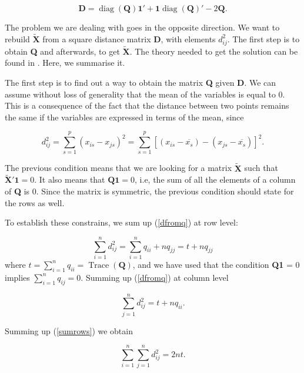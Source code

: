 \documentclass[11pt]{report}
\DeclareMathOperator{\Tr}{Trace}
\DeclareMathOperator{\diag}{diag}
\begin{document}
\[
\mathbf{D} = \diag(\mathbf{Q}) \mathbf{1}' + \mathbf{1}\diag(\mathbf{Q})' - 2\mathbf{Q}.
\]

\indent The problem we are dealing with goes in the opposite direction. We want 
to rebuild $\mathbf{\widetilde{X}}$ from a square distance matrix \textbf{D}, 
with elements $d_{ij}^2$. The first step is to obtain \textbf{Q} and afterwards, 
to get $\mathbf{\widetilde{X}}$. The theory needed to get the solution can be 
found in \cite{pena_libro}. Here, we summarise it.

\indent The first step is to find out a way to obtain the matrix \textbf{Q} 
given \textbf{D}. We can assume without loss of generality that the mean of 
the variables is equal to 0. This is a consequence of the fact that the distance 
between two points remains the same if the variables are expressed in terms 
of the mean, since


\begin{equation} \label{dtraslated}
d_{ij}^2 = \sum_{s = 1}^p (x_{is} - x_{js})^2 = \sum_{s=1} ^p [(x_{is} - \overline{x_s})- (x_{js} - \overline{x_s})]^2.
\end{equation}

\indent The previous condition means that we are looking for a matrix  
$\mathbf{\widetilde{X}}$ such that $\mathbf{\widetilde{X}'}\mathbf{1} = 0$. 
It also means that $\mathbf{Q}\mathbf{1} = 0$, i.e, the sum of all the elements 
of a column of \textbf{Q} is 0. Since the matrix is symmetric, the previous 
condition should state for the rows as well. 

\indent To establish these constrains, we sum up (\ref{dfromq}) at row level:

\begin{equation} \label{sumrows}
\sum_{i = 1}^n d_{ij}^2 = \sum_{i = 1}^n q_{ii} + nq_{jj} = t + nq_{jj}
\end{equation}
where $t = \sum_{i = 1}^n q_{ii} = \Tr(\mathbf{Q})$, and we have used that the
condition \textbf{Q}\textbf{1} = 0 implies $\sum_{i = 1}^n q_{ij} = 0$. Summing 
up (\ref{dfromq}) at column level

\begin{equation} \label{sumcols}
\sum_{j = 1}^n d_{ij}^2 = t + nq_{ii}.
\end{equation}

\indent Summing up (\ref{sumrows}) we obtain

\begin{equation} \label{doublesum}
\sum_{i = 1}^n\sum_{j = 1}^n d_{ij}^2 = 2nt.
\end{equation}
\end{document}
